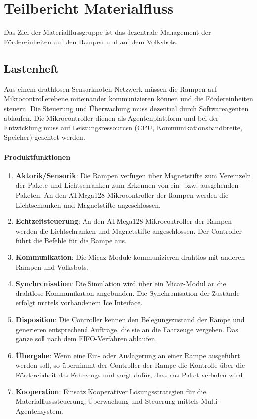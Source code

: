 \section{Teilbericht Materialfluss}
Das Ziel der Materialflussgruppe ist das dezentrale Management der Fördereinheiten auf den Rampen und auf dem Volksbots.
\subsection{Lastenheft}
Aus einem drathlosen Sensorknoten-Netzwerk müssen die Rampen auf Mikrocontrollerebene miteinander kommunizieren können und die Fördereinheiten steuern.
Die Steuerung und Überwachung muss dezentral durch Softwareagenten ablaufen. Die Mikrocontroller dienen als Agentenplattform und bei der Entwicklung muss 
auf Leistungsressourcen (CPU, Kommunikationsbandbreite, Speicher) geachtet werden.
\paragraph{Produktfunktionen}
\begin{enumerate}
 \item \textbf{Aktorik/Sensorik}: Die Rampen verfügen über Magnetstifte zum Vereinzeln der Pakete und Lichtschranken zum Erkennen von ein- bzw. ausgehenden Paketen.
An den ATMega128 Mikrocontroller der Rampen werden die Lichtschranken und Magnetstifte angeschlossen.
 \item \textbf{Echtzeitsteuerung}: An den ATMega128 Mikrocontroller der Rampen werden die Lichtschranken und Magnetstifte angeschlossen.
Der Controller führt die Befehle für die Rampe aus. 
 \item \textbf{Kommunikation}: Die Micaz-Module kommunizieren drahtlos mit anderen Rampen und Volksbots.
 \item \textbf{Synchronisation}: Die Simulation wird über ein Micaz-Modul an die drahtlose Kommunikation angebunden.
Die Synchronisation der Zustände erfolgt mittels vorhandenem Ice Interface.
 \item \textbf{Disposition}: Die Controller kennen den Belegungszustand der Rampe und generieren entsprechend Aufträge, die sie an die Fahrzeuge vergeben. 
 Das ganze soll nach dem FIFO-Verfahren ablaufen.
 \item \textbf{Übergabe}: Wenn eine Ein- oder Auslagerung an einer Rampe ausgeführt werden soll, so übernimmt der Controller der Rampe die Kontrolle über die Fördereinheit des Fahrzeugs und sorgt dafür, dass das Paket verladen wird.
 \item \textbf{Kooperation}: Einsatz Kooperativer Lösungsstrategien für die Materialflusssteuerung, Überwachung und Steuerung mittels Multi-Agentensystem.
\end{enumerate}

